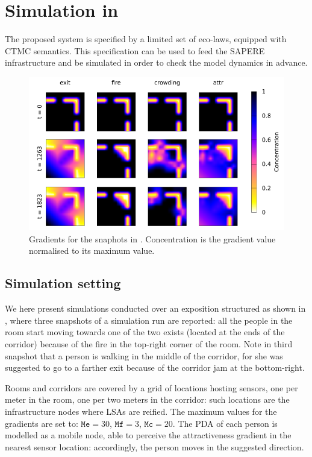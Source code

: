 \documentclass[12pt,a4paper,twoside,openright]{book}
\begin{document}
\section{Simulation in \alchemist{}}

The proposed system is specified by a limited set of eco-laws, equipped with CTMC semantics.
%
This specification  can be used to feed the SAPERE infrastructure and be simulated in order to check the model dynamics in advance.

\begin{figure}
  \begin{center}
  \includegraphics[width=.9\columnwidth]{img/gradient}
  \end{center}
  \caption[Gradients in crowd evacuation]{Gradients for the snaphots in . Concentration is the gradient value normalised to its maximum value.}
  \label{fig:field}
\end{figure}

\subsection{Simulation setting}

We here present simulations conducted over an exposition structured as shown in , where three snapshots of a simulation run are reported: all the people in the room start moving towards one of the two exists (located at the ends of the corridor) because of the fire in the top-right corner of the room.
%
Note in third snapshot that a person is walking in the middle of the corridor, for she was suggested to go to a farther exit because of the corridor jam at the bottom-right.

Rooms and corridors are covered by a grid of locations hosting sensors, one per meter in the room, one per two meters in the corridor: such locations are the infrastructure nodes where LSAs are reified.
%
The maximum values for the gradients are set to: $\mathtt{Me} = 30$,  $\mathtt{Mf}=3$,  $\mathtt{Mc}= 20$.  
%
The PDA of each person is modelled as a mobile node, able to perceive the attractiveness gradient in the nearest sensor location: accordingly, the person moves in the suggested direction.
\end{document}
